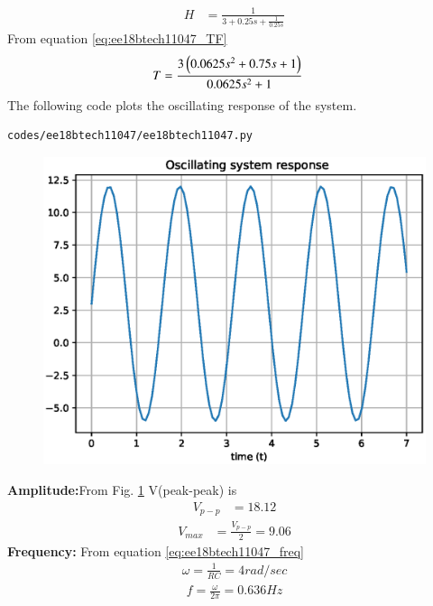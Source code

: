 \begin{enumerate}[label=\thesection.\arabic*.,ref=\thesection.\theenumi]
\begin{align}
H &= \frac{1}{3 + 0.25s + \frac{1}{0.25s}}
\end{align}
From equation \eqref{eq:ee18btech11047_TF}
\begin{align}
T &= \frac{3\left(0.0625s^{2} + 0.75s + 1\right)}{0.0625s^{2} + 1}
\end{align}
The following code plots the oscillating response of the system.
\begin{lstlisting}
codes/ee18btech11047/ee18btech11047.py
\end{lstlisting}
\begin{figure}[!ht]
\centering
\includegraphics[width=\columnwidth]{./figs/ee18btech11047/ee18btech11047.eps}
\caption{}
\label{fig:ee18btech11047_fig8}
\end{figure}
\textbf{Amplitude:}From Fig. \ref{fig:ee18btech11047_fig8} V(peak-peak) is 
\begin{align}
V_{p-p} &= 18.12
\end{align}
\begin{align}
V_{max} &= \frac{V_{p-p}}{2} = 9.06
\end{align}
\textbf{Frequency:} From equation \eqref{eq:ee18btech11047_freq}
\begin{align}
\omega = \frac{1}{RC} = 4 rad/sec
\end{align}
\begin{align}
f = \frac{\omega }{2\pi} = 0.636 Hz
\end{align}
\end{enumerate}
